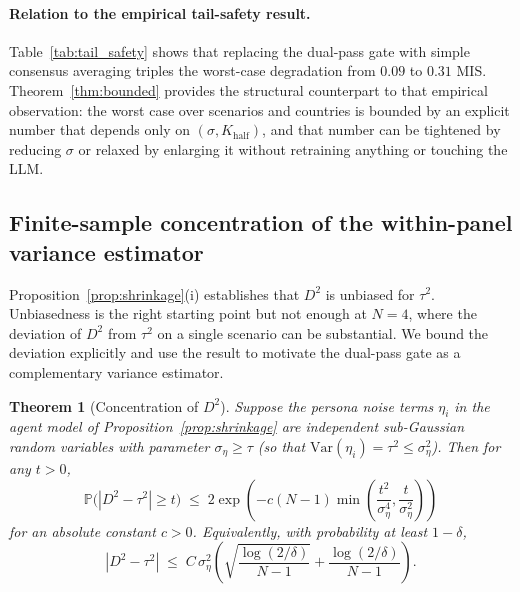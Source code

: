 \documentclass{article}
\newtheorem{theorem}{Theorem}
\begin{document}
\paragraph{Relation to the empirical tail-safety result.} Table~\ref{tab:tail_safety} shows that replacing the dual-pass gate with simple consensus averaging triples the worst-case degradation from $0.09$ to $0.31$ MIS. Theorem~\ref{thm:bounded} provides the structural counterpart to that empirical observation: the worst case over scenarios and countries is bounded by an explicit number that depends only on $(\sigma, K_{\text{half}})$, and that number can be tightened by reducing $\sigma$ or relaxed by enlarging it without retraining anything or touching the LLM.
\subsection{Finite-sample concentration of the within-panel variance estimator}
\label{app:theory:concentration}

Proposition~\ref{prop:shrinkage}(i) establishes that $D^2$ is unbiased for $\tau^2$. Unbiasedness is the right starting point but not enough at $N{=}4$, where the deviation of $D^2$ from $\tau^2$ on a single scenario can be substantial. We bound the deviation explicitly and use the result to motivate the dual-pass gate as a complementary variance estimator.

\begin{theorem}[Concentration of $D^2$]
\label{thm:concentration}
Suppose the persona noise terms $\eta_i$ in the agent model of Proposition~\ref{prop:shrinkage} are independent sub-Gaussian random variables with parameter $\sigma_\eta \geq \tau$ (so that $\mathrm{Var}(\eta_i) = \tau^2 \leq \sigma_\eta^2$). Then for any $t > 0$,
\begin{equation}
\mathbb{P}\!\big(|D^2 - \tau^2| \geq t\big) \;\leq\; 2\exp\!\left(-c(N-1)\min\!\left(\frac{t^2}{\sigma_\eta^4}, \frac{t}{\sigma_\eta^2}\right)\right)
\label{eq:concentration-tail}
\end{equation}
for an absolute constant $c > 0$. Equivalently, with probability at least $1 - \delta$,
\begin{equation}
|D^2 - \tau^2| \;\leq\; C\,\sigma_\eta^2 \!\left(\sqrt{\frac{\log(2/\delta)}{N-1}} + \frac{\log(2/\delta)}{N-1}\right).
\label{eq:concentration-hp}
\end{equation}
\end{theorem}
\end{document}
